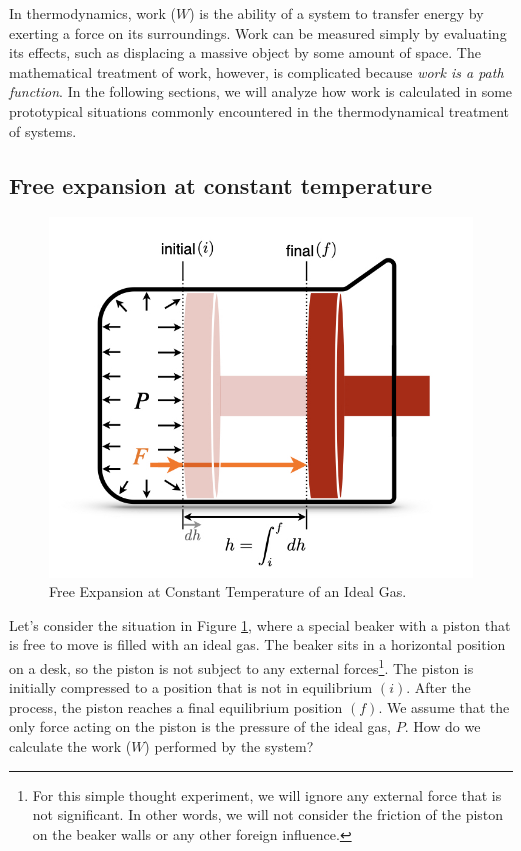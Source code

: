 \documentclass[
]{book}
\theoremstyle{definition}
\theoremstyle{definition}
\theoremstyle{definition}
\theoremstyle{remark}
\begin{document}
In thermodynamics, work (\(W\)) is the ability of a system to transfer energy by exerting a force on its surroundings. Work can be measured simply by evaluating its effects, such as displacing a massive object by some amount of space. The mathematical treatment of work, however, is complicated because \emph{work is a path function}. In the following sections, we will analyze how work is calculated in some prototypical situations commonly encountered in the thermodynamical treatment of systems.

\hypertarget{free-expansion-at-constant-temperature}{%
\subsection{Free expansion at constant temperature}\label{free-expansion-at-constant-temperature}}

\begin{figure}

{\centering \includegraphics[width=0.5\linewidth]{./img/OEP_Figures.003} 

}

\caption{Free Expansion at Constant Temperature of an Ideal Gas.}\label{fig:Fig1c3}
\end{figure}

Let's consider the situation in Figure \ref{fig:Fig1c3}, where a special beaker with a piston that is free to move is filled with an ideal gas. The beaker sits in a horizontal position on a desk, so the piston is not subject to any external forces\footnote{For this simple thought experiment, we will ignore any external force that is not significant. In other words, we will not consider the friction of the piston on the beaker walls or any other foreign influence.}. The piston is initially compressed to a position that is not in equilibrium \((i)\). After the process, the piston reaches a final equilibrium position \((f)\). We assume that the only force acting on the piston is the pressure of the ideal gas, \(P\). How do we calculate the work (\(W\)) performed by the system?
\end{document}
